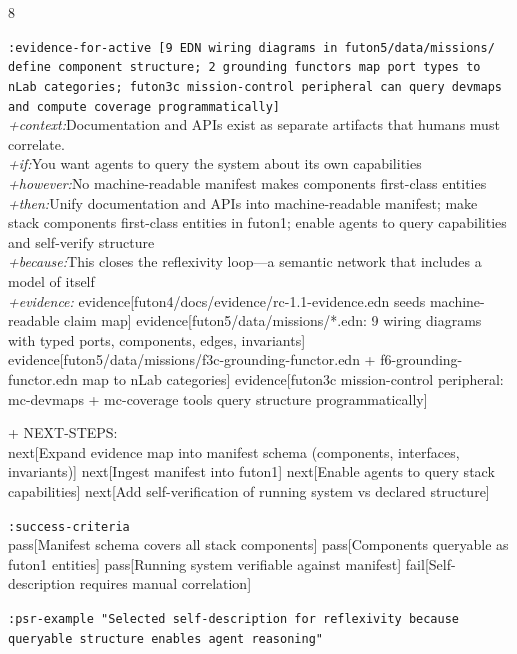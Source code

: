 \documentclass[landscape]{article}
\newcommand{\flexitag}[1]{\textcolor[gray]{0.35}{\textit{#1}}}
\newenvironment{devmapgreenfield}{%
  \def\FrameCommand{\colorbox{devmapgreenfieldbg}}%
  \setlength{\fboxsep}{2pt}%
  \MakeFramed{\advance\hsize-\width \FrameRestore}%
}{\endMakeFramed}
\begin{document}
\begin{paracol}{8}
\begin{devmapgreenfield}
  \texttt{:\allowbreak{}evidence-\allowbreak{}for-\allowbreak{}active [9 EDN wiring diagrams in futon5/\allowbreak{}data/\allowbreak{}missions/\allowbreak{} define component structure;\allowbreak{} 2 grounding functors map port types to nLab categories;\allowbreak{} futon3c mission-\allowbreak{}control peripheral can query devmaps and compute coverage programmatically]}\\
  \flexitag{+context:}Documentation and APIs exist as separate artifacts that humans must correlate.\\
  \flexitag{+if:}You want agents to query the system about its own capabilities\\
  \flexitag{+however:}No machine-readable manifest makes components first-class entities\\
  \flexitag{+then:}Unify documentation and APIs into machine-readable manifest; make stack components first-class entities in futon1; enable agents to query capabilities and self-verify structure\\
  \flexitag{+because:}This closes the reflexivity loop—a semantic network that includes a model of itself\\
  \flexitag{+evidence:} evidence[futon4/docs/evidence/rc-1.1-evidence.edn seeds machine-readable claim map] evidence[futon5/data/missions/*.edn: 9 wiring diagrams with typed ports, components, edges, invariants] evidence[futon5/data/missions/f3c-grounding-functor.edn + f6-grounding-functor.edn map to nLab categories] evidence[futon3c mission-control peripheral: mc-devmaps + mc-coverage tools query structure programmatically]\\
\par
  + NEXT-STEPS:\\
    next[Expand evidence map into manifest schema (components, interfaces, invariants)] next[Ingest manifest into futon1] next[Enable agents to query stack capabilities] next[Add self-verification of running system vs declared structure]\\
\par
  \texttt{:\allowbreak{}success-\allowbreak{}criteria}\\
    pass[Manifest schema covers all stack components] pass[Components queryable as futon1 entities] pass[Running system verifiable against manifest] fail[Self-description requires manual correlation]\\
\par
  \texttt{:\allowbreak{}psr-\allowbreak{}example "Selected self-\allowbreak{}description for reflexivity because queryable structure enables agent reasoning"}\\

\end{devmapgreenfield}
\end{paracol}
\end{document}
